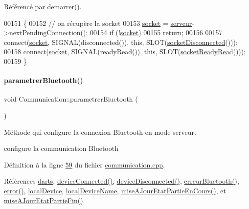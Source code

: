 Référencé par \hyperlink{communication_8cpp_source_l00101}{demarrer()}.


\begin{DoxyCode}
00151 \{
00152     \textcolor{comment}{// on récupère la socket}
00153     \hyperlink{class_communication_aa4ddc3151b305db0135d5826384645cc}{socket} = \hyperlink{class_communication_a6384747297d6efa9e8fd2fc79ed0c269}{serveur}->nextPendingConnection();
00154     \textcolor{keywordflow}{if} (!\hyperlink{class_communication_aa4ddc3151b305db0135d5826384645cc}{socket})
00155         \textcolor{keywordflow}{return};
00156 
00157     connect(\hyperlink{class_communication_aa4ddc3151b305db0135d5826384645cc}{socket}, SIGNAL(disconnected()), \textcolor{keyword}{this}, SLOT(\hyperlink{class_communication_a44f863f2c70f4be652224240447c9fe0}{socketDisconnected}()));
00158     connect(\hyperlink{class_communication_aa4ddc3151b305db0135d5826384645cc}{socket}, SIGNAL(readyRead()), \textcolor{keyword}{this}, SLOT(\hyperlink{class_communication_a0576a95d1f3c4ec49172a1040cfbeedf}{socketReadyRead}()));
00159 \}
\end{DoxyCode}
\mbox{\label{class_communication_abe2349c8e1d9536a73c8741425ba867f}} 
\paragraph{\texorpdfstring{parametrer\+Bluetooth()}{parametrerBluetooth()}}
{\footnotesize\ttfamily void Communication\+::parametrer\+Bluetooth (\begin{DoxyParamCaption}{ }\end{DoxyParamCaption})}



Méthode qui configure la connexion Bluetooth en mode serveur. 

configure la communication Bluetooth 

Définition à la ligne \hyperlink{communication_8cpp_source_l00059}{59} du fichier \hyperlink{communication_8cpp_source}{communication.\+cpp}.



Références \hyperlink{communication_8h_source_l00093}{darts}, \hyperlink{communication_8cpp_source_l00329}{device\+Connected()}, \hyperlink{communication_8cpp_source_l00353}{device\+Disconnected()}, \hyperlink{class_communication_a9cb85e46b57b6dfa9e71408010bfc0a9}{erreur\+Bluetooth()}, \hyperlink{communication_8cpp_source_l00372}{error()}, \hyperlink{communication_8h_source_l00096}{local\+Device}, \hyperlink{communication_8h_source_l00098}{local\+Device\+Name}, \hyperlink{communication_8cpp_source_l00415}{mise\+A\+Jour\+Etat\+Partie\+En\+Cours()}, et \hyperlink{communication_8cpp_source_l00404}{mise\+A\+Jour\+Etat\+Partie\+Fin()}.




